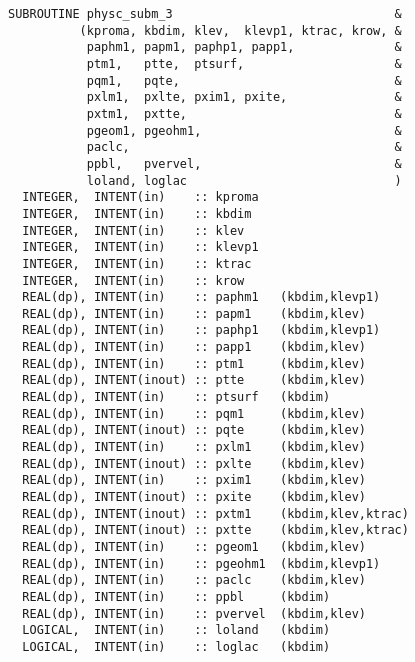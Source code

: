 \begin{lstlisting}[caption=physc\_subm\_3]
SUBROUTINE physc_subm_3                               &
          (kproma, kbdim, klev,  klevp1, ktrac, krow, &
           paphm1, papm1, paphp1, papp1,              &
           ptm1,   ptte,  ptsurf,                     &
           pqm1,   pqte,                              &
           pxlm1,  pxlte, pxim1, pxite,               &
           pxtm1,  pxtte,                             &
           pgeom1, pgeohm1,                           &
           paclc,                                     &
           ppbl,   pvervel,                           &
           loland, loglac                             )
  INTEGER,  INTENT(in)    :: kproma                   
  INTEGER,  INTENT(in)    :: kbdim                    
  INTEGER,  INTENT(in)    :: klev                     
  INTEGER,  INTENT(in)    :: klevp1                   
  INTEGER,  INTENT(in)    :: ktrac                    
  INTEGER,  INTENT(in)    :: krow                     
  REAL(dp), INTENT(in)    :: paphm1   (kbdim,klevp1)  
  REAL(dp), INTENT(in)    :: papm1    (kbdim,klev)    
  REAL(dp), INTENT(in)    :: paphp1   (kbdim,klevp1)  
  REAL(dp), INTENT(in)    :: papp1    (kbdim,klev)    
  REAL(dp), INTENT(in)    :: ptm1     (kbdim,klev)    
  REAL(dp), INTENT(inout) :: ptte     (kbdim,klev)    
  REAL(dp), INTENT(in)    :: ptsurf   (kbdim)         
  REAL(dp), INTENT(in)    :: pqm1     (kbdim,klev)    
  REAL(dp), INTENT(inout) :: pqte     (kbdim,klev)    
  REAL(dp), INTENT(in)    :: pxlm1    (kbdim,klev)    
  REAL(dp), INTENT(inout) :: pxlte    (kbdim,klev)    
  REAL(dp), INTENT(in)    :: pxim1    (kbdim,klev)   
  REAL(dp), INTENT(inout) :: pxite    (kbdim,klev)   
  REAL(dp), INTENT(inout) :: pxtm1    (kbdim,klev,ktrac)
  REAL(dp), INTENT(inout) :: pxtte    (kbdim,klev,ktrac)
  REAL(dp), INTENT(in)    :: pgeom1   (kbdim,klev)      
  REAL(dp), INTENT(in)    :: pgeohm1  (kbdim,klevp1)    
  REAL(dp), INTENT(in)    :: paclc    (kbdim,klev)      
  REAL(dp), INTENT(in)    :: ppbl     (kbdim)           
  REAL(dp), INTENT(in)    :: pvervel  (kbdim,klev)      
  LOGICAL,  INTENT(in)    :: loland   (kbdim)           
  LOGICAL,  INTENT(in)    :: loglac   (kbdim)           
\end{lstlisting}

